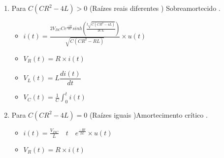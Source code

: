 \begin{enumerate}
\item
Para \quad $C(C R^2-4 L)>0$ \quad (Ra\'{i}zes  reais  diferentes ) \quad Sobreamortecido .\par
%
\begin{itemize}
\item
$i(t)=\frac{2 V_{DC} C e^{\frac{-tR}{2L}} sinh \left( \frac{t \sqrt{C(CR^2-4L)}}{2CL} \right)}{\sqrt{C(CR^2-RL)}}\times u(t)$\par
\item
$V_R(t)=R\times i(t)$\par
\item
$V_L(t)=L\dfrac{di(t)}{dt}$\par
%
\begin{minipage}{0.95\linewidth}
\end{minipage}\par
%
\item
$V_C(t)=\frac{1}{C}\int_0^ti(t)$\par
%
\begin{minipage}{0.95\linewidth}
\end{minipage}\par
%
\end{itemize}
\item
Para \quad $C(C R^2-4 L)=0$ \quad (Ra\'{i}zes  iguais )\quad Amortecimento  cr\'{i}tico .\par
%
\begin{itemize}
\item
$i(t)=\frac{V_{DC}}{L} \quad  t \quad e^{\frac{-R t}{2L}} \times u(t)$\par
\item
$V_R(t)=R\times i(t)$\par

\end{itemize}
\end{enumerate}
